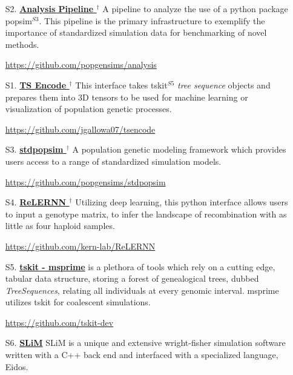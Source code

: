 \documentclass[letterpaper,11pt]{article}
\let\oldhref\href
\renewcommand{\href}[2]{\oldhref{#1}{\bfseries#2}}
\begin{document}
\begin{enumerate}

\item [S2.] \href{https://github.com/popgensims/analysis/tree/master/n_t}{Analysis Pipeline $^{\dagger}$} \space \space
        A pipeline to analyze the use of a python package popsim$^{S3}$. 
        This pipeline is the primary infrastructure to exemplify the importance of standardized simulation 
        data for benchmarking of novel methods.
        
        \space \url{https://github.com/popgensims/analysis}

\item [S1.] \href{https://github.com/jgallowa07/tsencode}{TS Encode $^{\dagger}$} \space \space
        This interface takes tskit$^{S5}$ \textit{tree sequence} objects 
        and prepares them into 3D tensors to be used for machine learning or
        visualization of population genetic processes. 
        
        \space \url{https://github.com/jgallowa07/tsencode}

\item [S3.] \href{https://github.com/popgensims/stdpopsim}{stdpopsim $^{\dagger}$} \space \space
        A population genetic modeling framework which provides
        users access to a range of standardized simulation models. 
        
        \space \url{https://github.com/popgensims/stdpopsim}

\item [S4.] \href{https://github.com/kern-lab/ReLERNN}{ReLERNN $^{\dagger}$} \space \space
        Utilizing deep learning, this python interface allows users to input a genotype matrix, 
        to infer the landscape of recombination with as little as four haploid samples. 

        \space \url{https://github.com/kern-lab/ReLERNN}

\item [S5.] \href{https://github.com/tskit-dev}{tskit - msprime} \space \space
         is a plethora of tools which rely on a cutting edge, tabular data structure, 
        storing a forest of genealogical trees, dubbed \textit{TreeSequences}, relating all individuals at every genomic interval. 
        msprime utilizes tskit for coalescent simulations.
        
        \space \url{https://github.com/tskit-dev}

\item [S6.] \href{https://messerlab.org/slim/}{SLiM} \space \space
        SLiM is a unique and extensive wright-fisher simulation software written with a C++ back end and 
        interfaced with a specialized language, Eidos.
        

\end{enumerate}
\end{document}
